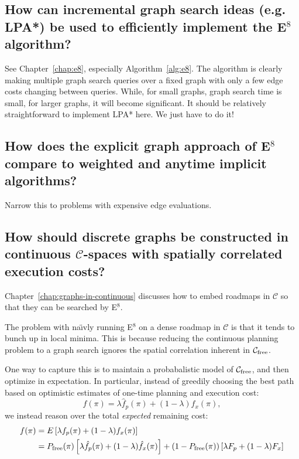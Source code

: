 {\subsection{How can incremental graph search ideas (e.g. LPA*)
   be used to efficiently implement the E$^8$ algorithm?}
\label{ques:incremental-search}

See Chapter~\ref{chap:e8}, especially Algorithm~\ref{alg:e8}.
The algorithm is clearly making multiple graph search queries
over a fixed graph with only a few edge costs changing between queries.
While, for small graphs, graph search time is small,
for larger graphs,
it will become significant.
It should be relatively straightforward to implement LPA* here.
We just have to do it!

\subsection{How does the explicit graph approach of E$^8$ compare to
   weighted and anytime implicit algorithms?}
\label{ques:e8-comparisons}

Narrow this to problems with expensive edge evaluations.

\subsection{How should discrete graphs be constructed in continuous
   $\mathcal{C}$-spaces with spatially correlated execution costs?}
\label{ques:batching}

Chapter~\ref{chap:graphs-in-continuous}
discusses how to embed roadmaps in $\mathcal{C}$
so that they can be searched by E$^8$.

The problem with na\"{\i}vly running E$^8$ on a
dense roadmap in $\mathcal{C}$
is that it tends to bunch up in local minima.
This is because reducing the continuous planning problem
to a graph search ignores the spatial correlation
inherent in $\mathcal{C}_{\mbox{\scriptsize free}}$.

One way to capture this is to maintain a probabalistic model
of $\mathcal{C}_{\mbox{\scriptsize free}}$,
and then optimize in expectation.
In particular,
instead of greedily choosing the best path based on
optimistic estimates of one-time planning and execution cost:
\begin{equation}
   f(\pi) = \lambda \hat{f}_p(\pi) + (1-\lambda) \hat{f}_x(\pi),
\end{equation}
we instead reason over the total \emph{expected} remaining cost:
\begin{align}
   f(\pi)
      &= E \left[ \lambda f_p(\pi) + (1-\lambda) f_x(\pi) \right] \\
   &= P_{\mbox{\scriptsize free}}(\pi)
      \left[ \lambda \hat{f}_p(\pi) + (1-\lambda) \hat{f}_x(\pi) \right]
      + (1-P_{\mbox{\scriptsize free}}(\pi))
      \left[ \lambda F_p + (1-\lambda) F_x \right]
\end{align}

}

